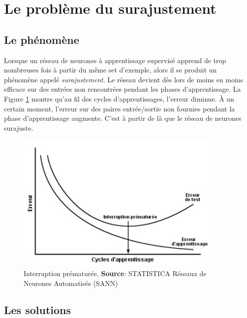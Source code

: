\section{Le problème du surajustement}
\subsection{Le phénomène}
Lorsque un réseau de neurones à apprentissage supervisé apprend de trop nombreuses fois à partir du même set d'exemple, alors il se produit un phénomène appelé \emph{surajustement}.\cite{statistica}
Le réseau devient dès lors de moins en moins efficace sur des entrées non rencontrées pendant les phases d'apprentissage.
La Figure \ref{interruption} montre qu'au fil des cycles d'apprentissages, l'erreur diminue.
À un certain moment, l'erreur sur des paires entrée/sortie non fournies pendant la phase d'apprentissage augmente. 
C'est à partir de là que le réseau de neurones surajuste.
\begin{figure}
 \centering
 \includegraphics[scale=0.6]{../figures/surgeneralisation.jpg}
 \caption{Interruption prématurée. \textbf{Source}: STATISTICA Réseaux de Neurones Automatisés (SANN)\cite{statistica}}
 \label{interruption}
\end{figure}
\subsection{Les solutions}
